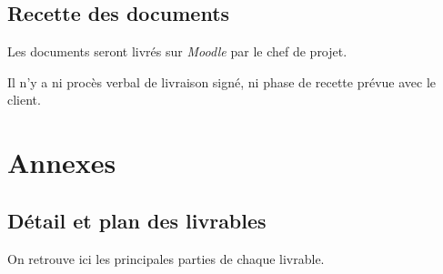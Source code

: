 \documentclass[twoside]{article}
\begin{document}
\subsection{Recette des documents}

Les documents seront livrés sur \textsl{Moodle} par le chef de projet. 


Il n'y a ni procès verbal de livraison signé, ni phase de recette prévue avec
le client.




\vfil
\pagebreak
\section{Annexes}


\subsection{Détail et plan des livrables}
On retrouve ici les principales parties de chaque livrable.
\end{document}

